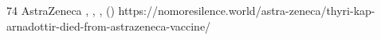           {}
          {74}
          {AstraZeneca}
          {}
          {
            ,
            ,
            ,
             ()
          }
          {https://nomoresilence.world/astra-zeneca/thyri-kap-arnadottir-died-from-astrazeneca-vaccine/}
